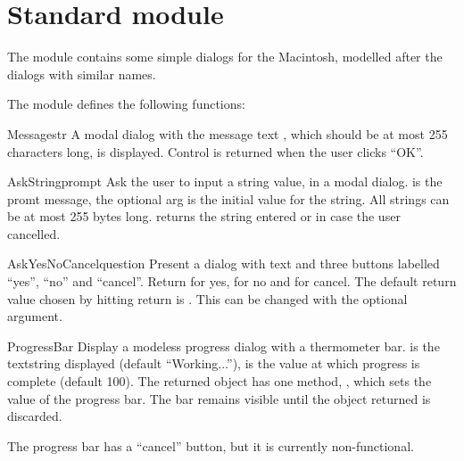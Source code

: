\section{Standard module }
\label{module-EasyDialogs}

The  module contains some simple dialogs for
the Macintosh, modelled after the  dialogs with similar
names.

The  module defines the following functions:

\renewcommand{\indexsubitem}{(in module EasyDialogs)}

\begin{funcdesc}{Message}{str}
A modal dialog with the message text , which should be at
most 255 characters long, is displayed. Control is returned when the
user clicks ``OK''.
\end{funcdesc}

\begin{funcdesc}{AskString}{prompt}
Ask the user to input a string value, in a modal dialog. 
is the promt message, the optional  arg is the initial
value for the string. All strings can be at most 255 bytes
long.  returns the string entered or  in
case the user cancelled.
\end{funcdesc}

\begin{funcdesc}{AskYesNoCancel}{question}
Present a dialog with text  and three buttons labelled
``yes'', ``no'' and ``cancel''. Return  for yes,  for
no and  for cancel. The default return value chosen by
hitting return is . This can be changed with the optional
 argument.
\end{funcdesc}

\begin{funcdesc}{ProgressBar}{}
Display a modeless progress dialog with a thermometer bar. 
is the textstring displayed (default ``Working...''),  is
the value at which progress is complete (default 100). The returned
object has one method, , which sets the value of the
progress bar. The bar remains visible until the object returned is
discarded.

The progress bar has a ``cancel'' button, but it is currently
non-functional.
\end{funcdesc}

